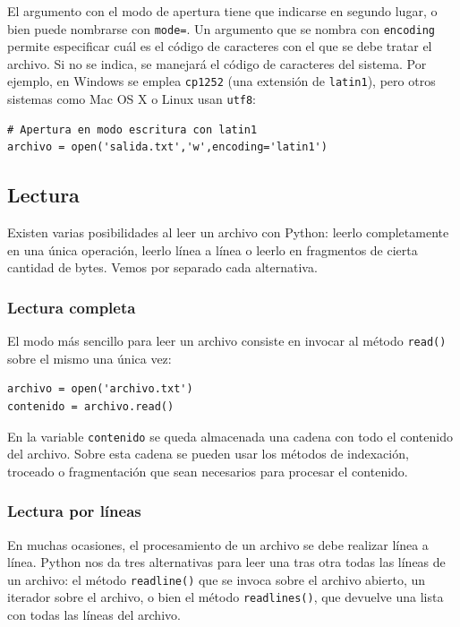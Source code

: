 El argumento con el modo de apertura tiene que indicarse en segundo lugar, o bien puede nombrarse con \texttt{mode=}. Un argumento que se nombra con \texttt{encoding} permite especificar cuál es el código de caracteres con el que se debe tratar el archivo. Si no se indica, se manejará el código de caracteres del sistema. Por ejemplo, en Windows se emplea \texttt{cp1252} (una extensión de \texttt{latin1}), pero otros sistemas como Mac OS X o Linux usan \texttt{utf8}:

\begin{lstlisting}
# Apertura en modo escritura con latin1
archivo = open('salida.txt','w',encoding='latin1')
\end{lstlisting}

\subsection{Lectura}

Existen varias posibilidades al leer un archivo con Python: leerlo completamente en una única operación, leerlo línea a línea o leerlo en fragmentos de cierta cantidad de bytes. Vemos por separado cada alternativa.

\subsubsection{Lectura completa}

El modo más sencillo para leer un archivo consiste en invocar al método \texttt{read()} sobre el mismo una única vez:

\begin{lstlisting}
archivo = open('archivo.txt')
contenido = archivo.read()
\end{lstlisting}

En la variable \texttt{contenido} se queda almacenada una cadena con todo el contenido del archivo. Sobre esta cadena se pueden usar los métodos de indexación, troceado o fragmentación que sean necesarios para procesar el contenido.

\subsubsection{Lectura por líneas}

En muchas ocasiones, el procesamiento de un archivo se debe realizar línea a línea. Python nos da tres alternativas para leer una tras otra todas las líneas de un archivo: el método \texttt{readline()} que se invoca sobre el archivo abierto, un iterador sobre el archivo, o bien el método \texttt{readlines()}, que devuelve una lista con todas las líneas del archivo.

